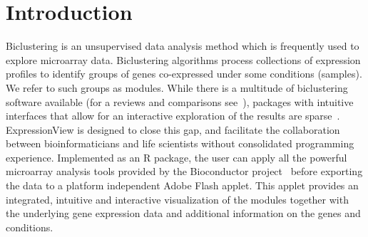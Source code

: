 \documentclass[round]{bioinfo}
\begin{document}
\vspace*{-7pt}
\section{Introduction}
Biclustering is an unsupervised data analysis method which is
frequently used to explore microarray data. 
Biclustering algorithms process collections of expression profiles to
identify groups of genes co-expressed under some conditions (samples).
We refer to such groups as modules. While
there is a multitude of biclustering software available (for a reviews 
and comparisons see~\cite{madeira04,ihmels04,prelic06}), packages with 
intuitive interfaces that allow for an interactive exploration of the results are
sparse~\citep{santamaria08}. ExpressionView is designed to close this
gap, and facilitate the collaboration between bioinformaticians and
life scientists without consolidated programming
experience. Implemented as an R package, the user can apply all the
powerful microarray analysis tools provided by the
Bioconductor project~\citep{gentleman04} before exporting the data to
a platform independent Adobe Flash applet. This applet
provides an integrated, intuitive and interactive visualization of
the modules together with the underlying gene expression data and
additional information on the genes and conditions.

\vspace*{-7pt}
\end{document}
